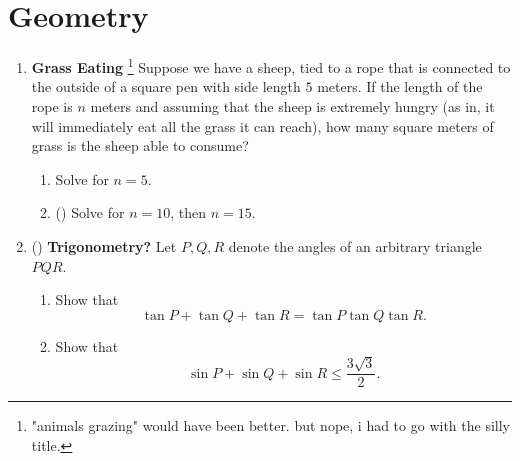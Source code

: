 \documentclass[11pt]{scrartcl}
\begin{document}
\section{Geometry}
\begin{enumerate}[label=\textbf{G\arabic*}.]
    \item \textbf{Grass Eating} \footnote{"animals grazing" would have been better. but nope, i had to go with the silly title.} \newline
    Suppose we have a sheep, tied to a rope that is connected to the outside of a square pen with side length $5$ meters. If the length of the rope is $n$ meters and assuming that the sheep is extremely hungry (as in, it will immediately eat all the grass it can reach), how many square meters of grass is the sheep able to consume?
    
    \begin{enumerate}
        \item Solve for $n = 5$.
        \item (\halfchili) Solve for $n = 10$, then $n = 15$.
    \end{enumerate}
    
    \item (\fullchili) \textbf{Trigonometry?} \newline
    Let $P, Q, R$ denote the angles of an arbitrary triangle $PQR$. 
    \begin{enumerate}
        \item Show that \[ \tan P + \tan Q + \tan R = \tan P \tan Q \tan R. \]
        \item Show that \[ \sin P + \sin Q + \sin R \leq \frac{3\sqrt{3}}{2}. \]
    \end{enumerate}
\end{enumerate}

\newpage
\end{document}
